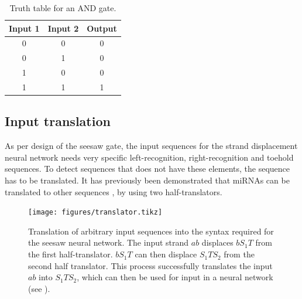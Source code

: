 \begin{table}[h]
\centering
\begin{tabular}{ccc}
  \hline
\multicolumn{1}{l}{\textbf{Input 1}} & \multicolumn{1}{l}{\textbf{Input 2}} & \multicolumn{1}{l}{\textbf{Output}} \\
\hline
0                                    & 0                                    & 0                                   \\
0                                    & 1                                    & 0                                   \\
1                                    & 0                                    & 0                                   \\
1                                    & 1                                    & 1 \\
\hline
\end{tabular}
\caption{Truth table for an AND gate.}
\label{and_table}
\end{table}

\subsection{Input translation}

As per design of the seesaw gate, the input sequences for the strand displacement neural network needs very specific left-recognition, right-recognition and toehold sequences. To detect sequences that does not have these elements, the sequence has to be translated. It has previously been demonstrated that miRNAs can be translated to other sequences \cite{Picuri2009}, by using two half-translators.

\begin{figure}[h]
    \texttt{[image: figures/translator.tikz]}
\caption{Translation of arbitrary input sequences into the syntax required for the seesaw neural network. The input strand $ab$ displaces $bS_1T$ from the first half-translator. $bS_1T$ can then displace $S_1TS_2$ from the second half translator. This process successfully translates the input $ab$ into $S_1TS_2$, which can then be used for input in a neural network (see ).}
\label{translator}
\end{figure}
